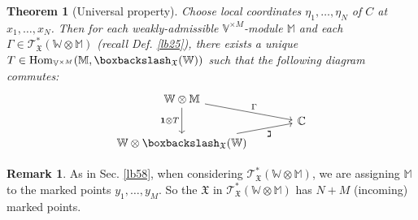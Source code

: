 \documentclass[11pt,b5paper,notitlepage]{article}
\theoremstyle{definition}
\newtheorem{rem}[df]{Remark}
\theoremstyle{plain}
\newtheorem{thm}[df]{Theorem}
\newcommand{\fk}{\mathfrak}
\newcommand{\idt}{\mathbf{1}}
\newcommand{\Hom}{\mathrm{Hom}}
\newcommand{\scr}{\mathscr}
\newcommand{\Vbb}{\mathbb V}
\newcommand{\Wbb}{\mathbb W}
\newcommand{\Mbb}{\mathbb M}
\newcommand{\Cbb}{\mathbb C}
\newcommand{\<}{\left\langle}
\renewcommand{\>}{\right\rangle}
\newcommand{\fx}{\mathfrak{X}}
\newcommand{\bbs}{\boxbackslash}
\numberwithin{equation}{section}
\begin{document}
\begin{thm}[Universal property]\label{lb50}
Choose local coordinates $\eta_1,\dots,\eta_N$ of $C$ at $x_1,\dots,x_N$. Then for each weakly-admissible $\Vbb^{\times M}$-module $\Mbb$ and each $\Gamma\in\scr T_{\fk X}^*(\Wbb\otimes\Mbb)$ (recall Def. \ref{lb25}), there exists a unique $T\in\Hom_{\Vbb^{\times M}}(\Mbb,\bbs_\fx(\Wbb))$ such that the following diagram commutes:
\begin{equation}
\begin{tikzcd}[row sep=tiny, column sep=large]
\Wbb\otimes\Mbb \arrow[rd,"\Gamma"] \arrow[dd,"\idt\otimes T"'] &   \\
                        & \Cbb \\
\Wbb\otimes\bbs_\fx(\Wbb) \arrow[ru,"\gimel"']            &  
\end{tikzcd}
\end{equation}
\end{thm}

\begin{rem}
As in Sec. \ref{lb58}, when considering $\scr T_{\fk X}^*(\Wbb\otimes\Mbb)$, we are assigning $\Mbb$ to the marked points $y_1,\dots,y_M$. So the $\fk X$ in $\scr T_{\fk X}^*(\Wbb\otimes\Mbb)$ has $N+M$ (incoming) marked points.
\end{rem}
\end{document}
